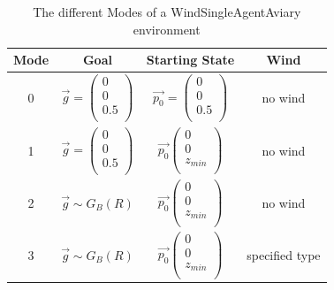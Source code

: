 \begin{table}[htp]
	\centering
	\caption{The different Modes of a WindSingleAgentAviary environment}\label{tab:mode}
	\begin{tabular}{|c|c|c|c|}
		\hline
		Mode & Goal & Starting State & Wind\\
		\hline
		0 & $\overrightarrow{g} =\left(\begin{array}{c}
			0\\
			0\\
			0.5\\
		\end{array}
		\right)$ & $\overrightarrow{p_0} = \left(\begin{array}{c}
			0\\
			0\\
			0.5\\
		\end{array}
		\right)$ & no wind\\
		\hline
		1 & $\overrightarrow{g} = \left(\begin{array}{c}
			0\\
			0\\
			0.5\\
		\end{array}
		\right)$ & $\overrightarrow{p_0}\left(\begin{array}{c}
			0\\
			0\\
			z_{min}\\
		\end{array}
		\right)$ & no wind\\
		\hline
		2 & $\overrightarrow{g} \sim G_{B}(R) $& $\overrightarrow{p_0}\left(\begin{array}{c}
			0\\
			0\\
			z_{min}\\
		\end{array}
		\right)$  & no wind\\
		\hline
		3 & $\overrightarrow{g} \sim G_{B}(R) $& $\overrightarrow{p_0}\left(\begin{array}{c}
			0\\
			0\\
			z_{min}\\
		\end{array}
		\right)$  & specified type\\
		\hline
	\end{tabular}
	\label{tab:modes}
\end{table}

